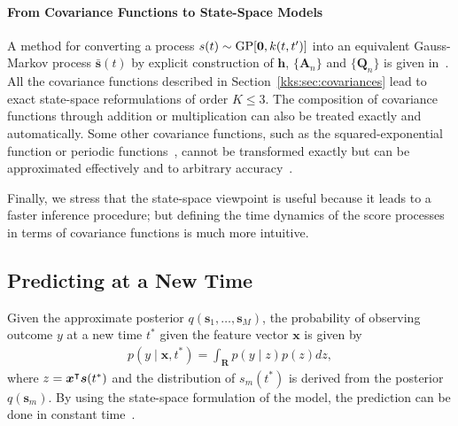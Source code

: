 \paragraph{From Covariance Functions to State-Space Models}
A method for converting a process $s(t) \sim \mathrm{GP}[\bm{0}, k(t, t')]$ into an equivalent Gauss-Markov process $\bar{\bm{s}}(t)$ by explicit construction of $\bm{h}$, $\{\bm{A}_n\}$ and $\{\bm{Q}_n\}$ is given in~\citet{solin2016stochastic}.
All the covariance functions described in Section~\ref{kks:sec:covariances} lead to exact state-space reformulations of order $K \leq 3$.
The composition of covariance functions through addition or multiplication can also be treated exactly and automatically.
Some other covariance functions, such as the squared-exponential function or periodic functions~\citep{rasmussen2006gaussian}, cannot be transformed exactly but can be approximated effectively and to arbitrary accuracy~\citep{hartikainen2010kalman, solin2014explicit}.

Finally, we stress that the state-space viewpoint is useful because it leads to a faster inference procedure; but defining the time dynamics of the score processes in terms of covariance functions is much more intuitive.


\subsection{Predicting at a New Time}

Given the approximate posterior $q(\bm{s}_1, \ldots, \bm{s}_M)$, the probability of observing outcome $y$ at a new time $t^*$ given the feature vector $\bm{x}$ is given by
\begin{align*}
	p(y \mid \bm{x}, t^*) = \int_\mathbf{R} p(y \mid z) p(z) dz,
\end{align*}
where $z = \bm{x}^\intercal \bm{s}(t^*)$ and the distribution of $s_m(t^*)$ is derived from the posterior $q(\bm{s}_m)$.
By using the state-space formulation of the model, the prediction can be done in constant time~\citep{saatci2012scalable}.
